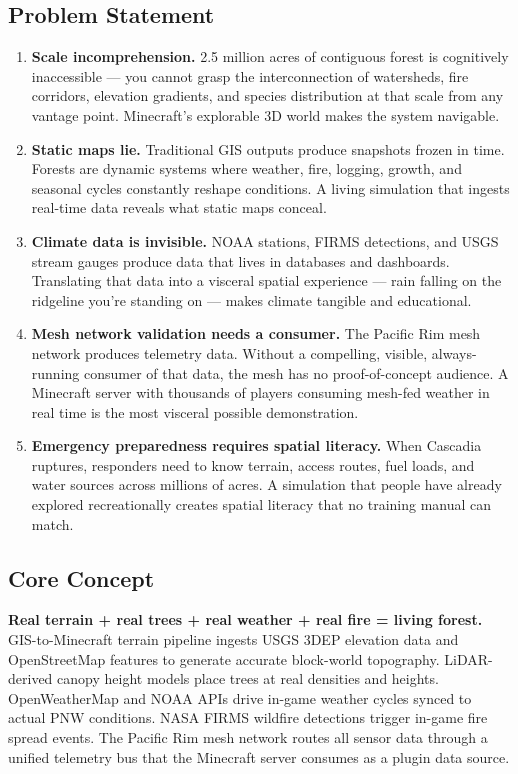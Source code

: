 \documentclass[11pt,letterpaper]{article}
\begin{document}
\subsection{Problem Statement}

\begin{enumerate}[label=\textbf{\arabic*.}]
  \item \textbf{Scale incomprehension.} 2.5 million acres of contiguous forest is cognitively inaccessible --- you cannot grasp the interconnection of watersheds, fire corridors, elevation gradients, and species distribution at that scale from any vantage point. Minecraft's explorable 3D world makes the system navigable.
  \item \textbf{Static maps lie.} Traditional GIS outputs produce snapshots frozen in time. Forests are dynamic systems where weather, fire, logging, growth, and seasonal cycles constantly reshape conditions. A living simulation that ingests real-time data reveals what static maps conceal.
  \item \textbf{Climate data is invisible.} NOAA stations, FIRMS detections, and USGS stream gauges produce data that lives in databases and dashboards. Translating that data into a visceral spatial experience --- rain falling on the ridgeline you're standing on --- makes climate tangible and educational.
  \item \textbf{Mesh network validation needs a consumer.} The Pacific Rim mesh network produces telemetry data. Without a compelling, visible, always-running consumer of that data, the mesh has no proof-of-concept audience. A Minecraft server with thousands of players consuming mesh-fed weather in real time is the most visceral possible demonstration.
  \item \textbf{Emergency preparedness requires spatial literacy.} When Cascadia ruptures, responders need to know terrain, access routes, fuel loads, and water sources across millions of acres. A simulation that people have already explored recreationally creates spatial literacy that no training manual can match.
\end{enumerate}

\subsection{Core Concept}

\begin{quotebox}
\textbf{Real terrain + real trees + real weather + real fire = living forest.}\\[0.5em]
GIS-to-Minecraft terrain pipeline ingests USGS 3DEP elevation data and OpenStreetMap features to generate accurate block-world topography. LiDAR-derived canopy height models place trees at real densities and heights. OpenWeatherMap and NOAA APIs drive in-game weather cycles synced to actual PNW conditions. NASA FIRMS wildfire detections trigger in-game fire spread events. The Pacific Rim mesh network routes all sensor data through a unified telemetry bus that the Minecraft server consumes as a plugin data source.
\end{quotebox}
\end{document}
